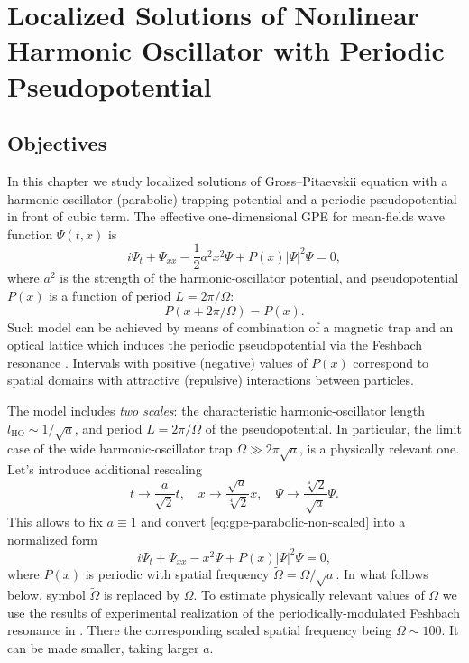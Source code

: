 
\chapter{Localized Solutions of Nonlinear Harmonic Oscillator with Periodic Pseudopotential}

\section{Objectives}

In this chapter we study localized solutions of Gross--Pitaevskii equation with a harmonic-oscillator (parabolic) trapping potential and a periodic pseudopotential in front of cubic term.
The effective one-dimensional GPE for mean-fields wave function $\Psi(t, x)$ is
\begin{equation}
	i \Psi_t + \Psi_{xx} - \dfrac{1}{2} a^2 x^2 \Psi + P(x) |\Psi|^2 \Psi = 0,
\label{eq:gpe-parabolic-non-scaled}
\end{equation}
where $a^2$ is the strength of the harmonic-oscillator potential, and pseudopotential $P(x)$ is a function of period $L = 2 \pi / \Omega$:
\begin{equation}
	P(x + 2 \pi / \Omega) = P(x).
\end{equation}
Such model can be achieved by means of combination of a magnetic trap and an optical lattice which induces the periodic pseudopotential via the Feshbach resonance \cite{SakaguchiMalomed2010}.
Intervals with positive (negative) values of $P(x)$ correspond to spatial domains with attractive (repulsive) interactions between particles.

The model includes {\it two scales}: the characteristic harmonic-oscillator length $l_{\mathrm{HO}} \sim 1 / \sqrt{a}$, and period $L = 2 \pi / \Omega$ of the pseudopotential.
In particular, the limit case of the wide harmonic-oscillator trap $\Omega \gg 2 \pi \sqrt{a}$, is a physically relevant one.
Let's introduce additional rescaling
\begin{equation}
	t \to \dfrac{a}{\sqrt{2}} t, \quad x \to \dfrac{\sqrt{a}}{\sqrt[4]{2}} x, \quad \Psi \to \dfrac{\sqrt[4]{2}}{\sqrt{a}} \Psi.
\end{equation}
This allows to fix $a \equiv 1$ and convert \eqref{eq:gpe-parabolic-non-scaled} into a normalized form
\begin{equation}
	i \Psi_t + \Psi_{xx} - x^2 \Psi + P(x) |\Psi|^2 \Psi = 0,
\label{eq:gpe-parabolic}
\end{equation}
where $P(x)$ is periodic with spatial frequency $\widetilde{\Omega} = \Omega / \sqrt{a}$.
In what follows below, symbol $\widetilde{\Omega}$ is replaced by $\Omega$.
To estimate physically relevant values of $\Omega$ we use the results of experimental realization of the periodically-modulated Feshbach resonance in \cite{YamazakiTaieSugawaTakahashi}.
There the corresponding scaled spatial frequency being $\Omega \sim 100$.
It can be made smaller, taking larger $a$.

